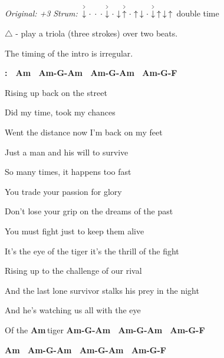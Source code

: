 \begin{song}


\begin{headerbox}
\RaiseBoxWithAccents
\textit{Original: +3} \quad
\textit{Strum:} $\AccentDown\Miss\Miss\Miss\AccentDown\Miss\Down\AccentUp \Miss\Up\Down\Miss\AccentDown\Up\Down\Up$ double time
\end{headerbox}

\begin{hchordbox}
\end{hchordbox}

\Large


\bigskip

{
\smaller $\triangle$ - play a triola (three strokes) over two beats. \par
The timing of the intro is irregular.
}

\bigskip

\Intro\textbf{:}\ \  
\textbf{Am \ Am-G-Am \ Am-G-Am \ Am-G-F \ }  \par

\bigskip

 Rising up back on the street \par
{} Did my time, took my chances \par
{} Went the distance now I’m back on my feet \par
Just a \ch{G}man and his will to sur\ch{Am}vive \par

\bigskip

 So many times, it happens too fast \par
{} You trade your passion for glory \par
{} Don’t lose your grip on the dreams of the past \par
You must \ch{G}fight just to keep them a\ch{Am}live \par

\bigskip

\begin{chorusbox}{\Chorus}
It’s the  eye of the tiger it’s the thrill of the fight \par
Rising up to the challenge of our \ch{C\beat}ri\ch{G\beats3}val \par
And the \ch{Dm}last lone survivor stalks his \ch{C\beats2}prey in the night \par
And he’s \ch{Dm\suptriangle}watching us \ch{C\suptriangle}all with the \ch{F\rep2}eye \par
Of the \textbf{Am\,}tiger \textbf{Am-G-Am \ Am-G-Am \ Am-G-F \ } \par
\textbf{Am \ Am-G-Am \ Am-G-Am \ Am-G-F \ } \par
\end{chorusbox}


\end{song}
